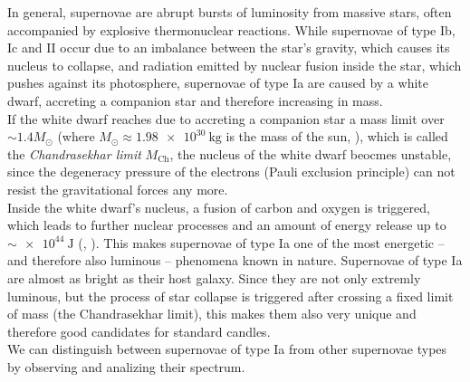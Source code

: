In general, supernovae are abrupt bursts of luminosity from massive stars, often accompanied by explosive thermonuclear reactions.
While supernovae of type Ib, Ic and II occur due to an imbalance between the star's gravity, which causes its nucleus to collapse, and radiation emitted by nuclear fusion inside the star, which pushes against its photosphere, supernovae of type Ia are caused by a white dwarf, accreting a companion star and therefore increasing in mass. \\
If the white dwarf reaches due to accreting a companion star a mass limit over $\sim 1.4 M_{\odot}$ (where $M_{\odot} \approx \SI{1.98e+30}{\kilogram}$ is the mass of the sun, \cite[p. 48]{Bartelmann2019}), which is called the \textit{Chandrasekhar limit} $M_{\text{Ch}}$, the nucleus of the white dwarf beocmes unstable, since the degeneracy pressure of the electrons (Pauli exclusion principle) can not resist the gravitational forces any more. \\
Inside the white dwarf's nucleus, a fusion of carbon and oxygen is triggered, which leads to further nuclear processes and an amount of energy release up to $\sim \SI{e+44}{\joule}$ (\cite[p. 295]{Maguire2017}, \cite[p. 321]{Spatschek2017}).
This makes supernovae of type Ia one of the most energetic -- and therefore also luminous -- phenomena known in nature. Supernovae of type Ia are almost as bright as their host galaxy. 
Since they are not only extremly luminous, but the process of star collapse is triggered after crossing a fixed limit of mass (the Chandrasekhar limit), this makes them also very unique and therefore good candidates for standard candles. \\
\noindent We can distinguish between supernovae of type Ia from other supernovae types by observing and analizing their spectrum.

